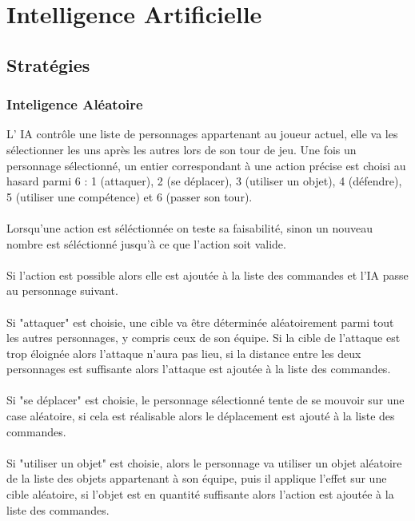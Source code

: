 \chapter{Intelligence Artificielle}

\section{Stratégies}

\subsection{Inteligence Aléatoire}

L’ IA contrôle une liste de personnages appartenant au joueur actuel,
elle va les sélectionner les uns après les autres lors de son tour 
de jeu.
Une fois un personnage sélectionné, un entier correspondant à une 
action précise est choisi au hasard parmi 6 : 1 (attaquer), 2 (se 
déplacer), 3 (utiliser un objet), 4 (défendre), 5 (utiliser une 
compétence) et 6 (passer son tour).
\\\\
Lorsqu'une action est séléctionnée on teste sa faisabilité, sinon un 
nouveau nombre est séléctionné jusqu'à ce que l'action soit valide. 
\\\\
Si l'action est possible alors elle est ajoutée à la liste des 
commandes et l'IA passe au personnage suivant.
\\\\
Si "attaquer" est choisie, une cible va être déterminée aléatoirement
parmi tout les autres personnages, y compris ceux de son équipe. Si 
la cible de l'attaque est trop éloignée alors l’attaque n’aura pas 
lieu, si la distance entre les deux personnages est suffisante alors 
l'attaque est ajoutée à la liste des commandes.
\\\\
Si "se déplacer" est choisie, le personnage sélectionné tente de se 
mouvoir sur une case aléatoire, si cela est réalisable alors le 
déplacement est ajouté à la liste des commandes.
\\\\
Si "utiliser un objet" est choisie, alors le personnage va utiliser 
un objet aléatoire de la liste des objets appartenant à son équipe, 
puis il applique l'effet sur une cible aléatoire, si l'objet est en 
quantité suffisante alors l'action est ajoutée à la liste des 
commandes.
\\\\
